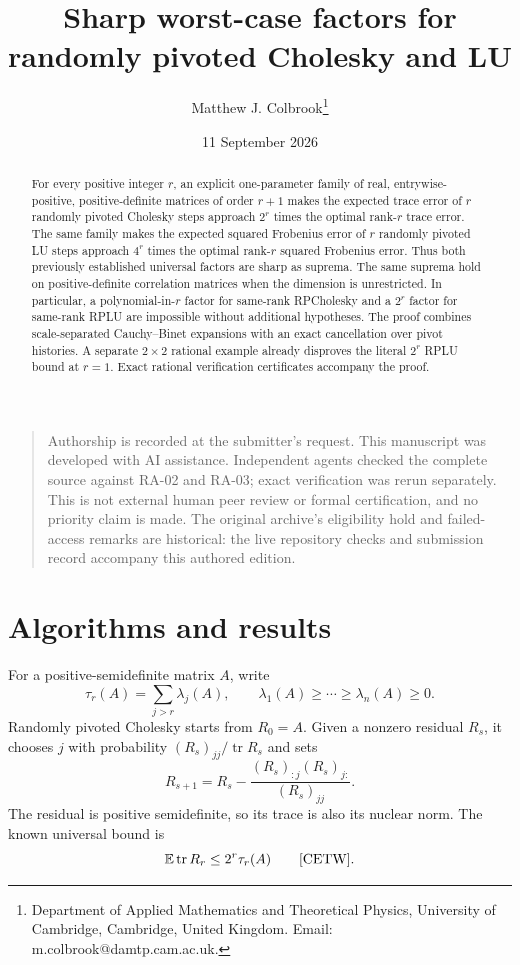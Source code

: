 \documentclass[11pt]{article}
\title{Sharp worst-case factors for randomly pivoted Cholesky and LU}
\author{Matthew J. Colbrook\thanks{Department of Applied Mathematics and Theoretical Physics, University of Cambridge, Cambridge, United Kingdom. Email: m.colbrook@damtp.cam.ac.uk.}}
\date{11 September 2026}
\theoremstyle{remark}
\DeclareMathOperator{\tr}{tr}
\newcommand{\E}{\mathbb E}
\begin{document}
\maketitle

\begin{quote}\small
Authorship is recorded at the submitter's request. This manuscript was developed with AI assistance. Independent agents checked the complete source against RA-02 and RA-03; exact verification was rerun separately. This is not external human peer review or formal certification, and no priority claim is made. The original archive's eligibility hold and failed-access remarks are historical: the live repository checks and submission record accompany this authored edition.
\end{quote}
\begin{abstract}
For every positive integer $r$, an explicit one-parameter family of real,
entrywise-positive, positive-definite matrices of order $r+1$ makes the expected
trace error of $r$ randomly pivoted Cholesky steps approach $2^r$ times the optimal
rank-$r$ trace error. The same family makes the expected squared Frobenius error
of $r$ randomly pivoted LU steps approach $4^r$ times the optimal rank-$r$
squared Frobenius error. Thus both previously established universal factors are
sharp as suprema. The same suprema hold on positive-definite correlation
matrices when the dimension is unrestricted. In particular, a polynomial-in-$r$ factor for same-rank
RPCholesky and a $2^r$ factor for same-rank RPLU are impossible without additional
hypotheses. The proof combines scale-separated Cauchy--Binet expansions with an
exact cancellation over pivot histories. A separate $2\times2$ rational example
already disproves the literal $2^r$ RPLU bound at $r=1$. Exact rational
verification certificates accompany the proof.
\end{abstract}

\section{Algorithms and results}

For a positive-semidefinite matrix $A$, write
\[
 \tau_r(A)=\sum_{j>r}\lambda_j(A),
 \qquad \lambda_1(A)\ge\cdots\ge\lambda_n(A)\ge0.
\]
Randomly pivoted Cholesky starts from $R_0=A$. Given a nonzero residual $R_s$,
it chooses $j$ with probability $(R_s)_{jj}/\tr R_s$ and sets
\begin{equation}\label{eq:chol-update}
 R_{s+1}=R_s-\frac{(R_s)_{:j}(R_s)_{j:}}{(R_s)_{jj}}.
\end{equation}
The residual is positive semidefinite, so its trace is also its nuclear norm.
The known universal bound is
\begin{equation}\label{eq:known-chol}
 \E\tr R_r\le 2^r\tau_r(A)
 \qquad\text{\cite[Lemma 5.5]{CETW}}.
\end{equation}
\end{document}
